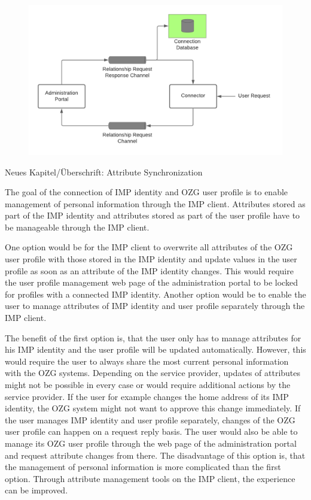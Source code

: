 \documentclass[
     12pt,         %
     a4paper,      %
     BCOR=10mm,version=first,     %
     DIV=14,version=first,        %
     ]{scrreprt}
\begin{document}
\begin{figure}[h]
    \centering
    \includegraphics[scale=0.3]{Diagrams/Integration Architecture 1/Overview/Relationship Request.png}
\end{figure}


Neues Kapitel/Überschrift: Attribute Synchronization

The goal of the connection of IMP identity and OZG user profile is to enable management of personal information through the IMP client. Attributes stored as part of the IMP identity and attributes stored as part of the user profile have to be manageable through the IMP client.

One option would be for the IMP client to overwrite all attributes of the OZG user profile with those stored in the IMP identity and update values in the user profile as soon as an attribute of the IMP identity changes. This would require the user profile management web page of the administration portal to be locked for profiles with a connected IMP identity. Another option would be to enable the user to manage attributes of IMP identity and user profile separately through the IMP client.

The benefit of the first option is, that the user only has to manage attributes for his IMP identity and the user profile will be updated automatically. However, this would require the user to always share the most current personal information with the OZG systems. Depending on the service provider, updates of attributes might not be possible in every case or would require additional actions by the service provider. If the user for example changes the home address of its IMP identity, the OZG system might not want to approve this change immediately. If the user manages IMP identity and user profile separately, changes of the OZG user profile can happen on a request reply basis. The user would also be able to manage its OZG user profile through the web page of the administration portal and request attribute changes from there. The disadvantage of this option is, that the management of personal information is more complicated than the first option. Through attribute management tools on the IMP client, the experience can be improved.
\end{document}
